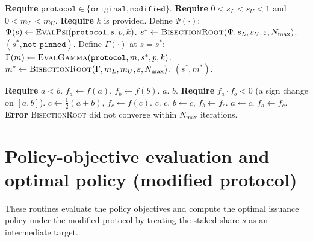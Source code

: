 \documentclass[11pt]{article}
\begin{document}
\begin{algorithm}[H]
\caption{\textsc{SolveBGP}$(\texttt{protocol},p,k,[s_L,s_U],[m_L,m_U],\varepsilon,N_{\max})$}
\begin{algorithmic}[1]
\State \textbf{Require} $\texttt{protocol}\in\{\texttt{original},\texttt{modified}\}$.
\State \textbf{Require} $0<s_L<s_U<1$ and $0<m_L<m_U$.
    \State \textbf{Require} $k$ is provided.
\EndIf
\State Define $\Psi(\cdot)$:
\State $\Psi(s)\gets \textsc{EvalPsi}(\texttt{protocol},s,p,k)$.
\State $s^* \gets \textsc{BisectionRoot}(\Psi,s_L,s_U,\varepsilon,N_{\max})$.
    \State \Return $(s^*,\texttt{not pinned})$.
\EndIf
\State Define $\Gamma(\cdot)$ at $s=s^*$:
\State $\Gamma(m)\gets \textsc{EvalGamma}(\texttt{protocol},m,s^*,p,k)$.
\State $m^* \gets \textsc{BisectionRoot}(\Gamma,m_L,m_U,\varepsilon,N_{\max})$.
\State \Return $(s^*,m^*)$.
\end{algorithmic}
\end{algorithm}

\begin{algorithm}[H]
\caption{\textsc{BisectionRoot}$(f,a,b,\varepsilon,N_{\max})$}
\begin{algorithmic}[1]
\State \textbf{Require} $a<b$.
\State $f_a \gets f(a)$, $f_b \gets f(b)$.
 \State \Return $a$. \EndIf
{} \State \Return $b$. \EndIf
\State \textbf{Require} $f_a\cdot f_b < 0$ (a sign change on $[a,b]$).
    \State $c \gets \tfrac{1}{2}(a+b)$, $f_c \gets f(c)$.
     \State \Return $c$. \EndIf
     \State \Return $c$. \EndIf
        \State $b \gets c$, $f_b \gets f_c$.
    \Else
        \State $a \gets c$, $f_a \gets f_c$.
    \EndIf
\EndFor
\State \textbf{Error} \textsc{BisectionRoot} did not converge within $N_{\max}$ iterations.
\end{algorithmic}
\end{algorithm}

\section{Policy-objective evaluation and optimal policy (modified protocol)}
These routines evaluate the policy objectives and compute the optimal issuance policy under the modified protocol by treating the staked share $s$ as an intermediate target.
\end{document}
